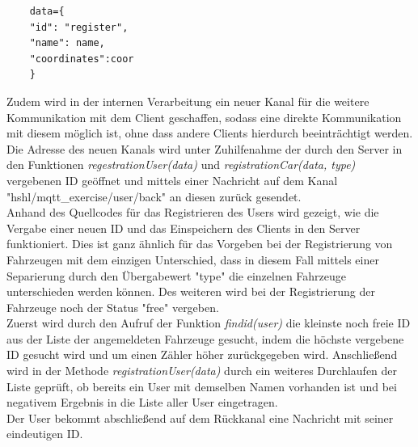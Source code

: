 \begin{lstlisting}
    data={
    "id": "register",
    "name": name,
    "coordinates":coor
    }
\end{lstlisting}
Zudem wird in der internen Verarbeitung ein neuer Kanal für die weitere Kommunikation mit dem Client geschaffen, sodass eine direkte Kommunikation mit diesem möglich ist, ohne dass andere Clients hierdurch beeinträchtigt werden. Die Adresse des neuen Kanals wird unter Zuhilfenahme  der durch den Server in den Funktionen \textit{regestrationUser(data)} und \textit{registrationCar(data, type)} vergebenen ID geöffnet und mittels einer Nachricht auf dem Kanal \textsf{"hshl/mqtt\_exercise/user/back"} an diesen zurück gesendet. \\
Anhand des Quellcodes für das Registrieren des Users wird gezeigt, wie die Vergabe einer neuen ID und das Einspeichern des Clients in den Server funktioniert. Dies ist ganz ähnlich für das Vorgeben bei der Registrierung von Fahrzeugen mit dem einzigen Unterschied, dass in diesem Fall mittels einer Separierung durch den Übergabewert "type" die einzelnen Fahrzeuge unterschieden werden können. Des weiteren wird bei der Registrierung der Fahrzeuge noch der Status "free" vergeben.\\
Zuerst wird durch den Aufruf der Funktion \textit{findid(user)} die kleinste noch freie ID aus der Liste der angemeldeten Fahrzeuge gesucht, indem die höchste vergebene ID gesucht wird und um einen Zähler höher zurückgegeben wird. Anschließend wird in der Methode \textit{registrationUser(data)} durch ein weiteres Durchlaufen der Liste geprüft, ob bereits ein User mit demselben Namen vorhanden ist und bei negativem Ergebnis in die Liste aller User eingetragen.\\ Der User bekommt abschließend auf dem Rückkanal eine Nachricht mit seiner eindeutigen ID.
